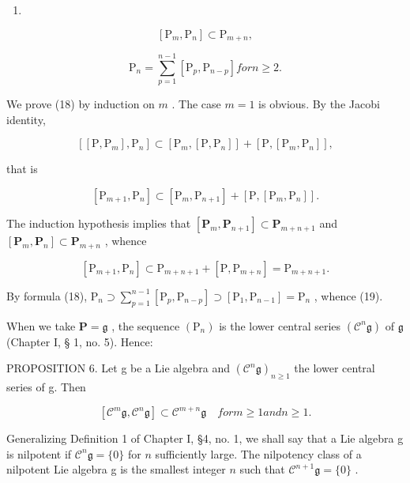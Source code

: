 \begin{enumerate}
\def\labelenumi{(\arabic{enumi})}
\setcounter{enumi}{17}
\tightlist
\item
\end{enumerate}

\[
[ \mathrm{P} _ {m}, \mathrm{P} _ {n} ] \subset \mathrm{P} _ {m + n},\tag{18}
\]

\[
\mathrm{P} _ {n} = \sum_ {p = 1} ^ {n - 1} \left[ \mathrm{P} _ {p}, \mathrm{P} _ {n - p} \right] for n \geqslant 2.\tag{19}
\]

We prove (18) by induction on \(m\) . The case \(m = 1\) is obvious. By the Jacobi identity,

\[
[ [ \mathrm{P}, \mathrm{P} _ {m} ], \mathrm{P} _ {n} ] \subset [ \mathrm{P} _ {m}, [ \mathrm{P}, \mathrm{P} _ {n} ] ] + [ \mathrm{P}, [ \mathrm{P} _ {m}, \mathrm{P} _ {n} ] ],
\]

that is

\[
[ \mathrm{P} _ {m + 1}, \mathrm{P} _ {n} ] \subset [ \mathrm{P} _ {m}, \mathrm{P} _ {n + 1} ] + [ \mathrm{P}, [ \mathrm{P} _ {m}, \mathrm{P} _ {n} ] ].
\]

The induction hypothesis implies that \([\mathbf{P}_m, \mathbf{P}_{n+1}] \subset \mathbf{P}_{m+n+1}\) and \([\mathbf{P}_m, \mathbf{P}_n] \subset \mathbf{P}_{m+n}\) , whence

\[
[ \mathrm{P} _ {m + 1}, \mathrm{P} _ {n} ] \subset \mathrm{P} _ {m + n + 1} + [ \mathrm{P}, \mathrm{P} _ {m + n} ] = \mathrm{P} _ {m + n + 1}.
\]

By formula (18), \(\mathrm{P}_n\supset \sum_{p = 1}^{n - 1}[\mathrm{P}_p,\mathrm{P}_{n - p}]\supset [\mathrm{P}_1,\mathrm{P}_{n - 1}] = \mathrm{P}_n\) , whence (19).

When we take \(\mathbf{P} = \mathfrak{g}\) , the sequence \((\mathrm{P}_n)\) is the lower central series \((\mathcal{C}^n\mathfrak{g})\) of \(\mathfrak{g}\) (Chapter I, § 1, no. 5). Hence:

PROPOSITION 6. Let g be a Lie algebra and \((\mathcal{C}^{n}\mathfrak{g})_{n\geqslant 1}\) the lower central series of g. Then

\[
[ \mathcal {C} ^ {m} \mathfrak {g}, \mathcal {C} ^ {n} \mathfrak {g} ] \subset \mathcal {C} ^ {m + n} \mathfrak {g} \quad for m \geqslant 1 and n \geqslant 1.
\]

Generalizing Definition 1 of Chapter I, §4, no. 1, we shall say that a Lie algebra g is nilpotent if \(\mathcal{C}^{n}\mathfrak{g} = \{0\}\) for \(n\) sufficiently large. The nilpotency class of a nilpotent Lie algebra g is the smallest integer \(n\) such that \(\mathcal{C}^{n + 1}\mathfrak{g} = \{0\}\) .

